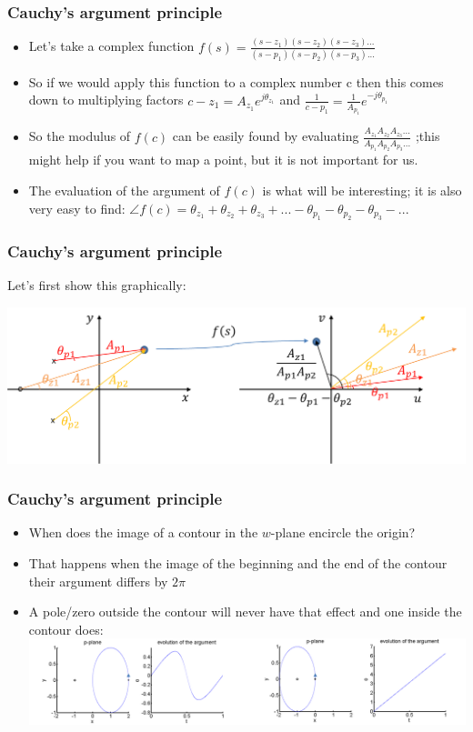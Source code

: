 \begin{frame}
\frametitle{Cauchy’s argument principle}
\begin{itemize}
\item Let’s take a complex function $f(s)=\frac{(s-z_1)(s-z_2)(s-z_3)...}{(s-p_1)(s-p_2)(s-p_3)...}$ 
\item So if we would apply this function to a complex number c then this comes down to multiplying factors $ c-z_1 = A_{z_1}e^{j\theta_{z_1}}$ and $\frac {1}{c-p_1} = \frac{1}{A_{p_1}}e^{-j\theta_{p_1}} $ 
\item So the modulus of $f(c)$ can be easily found by evaluating $\frac{A_{z_1}A_{z_2}A_{z_3}...}{A_{p_1}A_{p_2}A_{p_3}...}$ ;this might help if you want to map a point, but it is not important for us.
\item The evaluation of the argument of $f(c)$ is what will be interesting; it is also very easy to find: $ \angle f(c) = \theta_{z_1} + \theta_{z_2}+\theta_{z_3}+...-\theta_{p_1} - \theta_{p_2} - \theta_{p_3}-... $ 
\end{itemize}
\end{frame}

\begin{frame}
\frametitle{Cauchy’s argument principle}
Let’s first show this graphically:

\includegraphics[width= 0.9\linewidth]{Afbeelding4} 
\end{frame}

\begin{frame}
\frametitle{Cauchy’s argument principle}
\begin{itemize}
\item When does the image of a contour in the $w$-plane encircle the origin?
\item That happens when the image of the beginning and the end of the contour their argument differs by $2\pi$
\item A pole/zero outside the contour will never have that effect and one inside the contour does:
\\
\includegraphics[width=0.95\linewidth]{Afbeelding5}
\end{itemize}
\end{frame}

